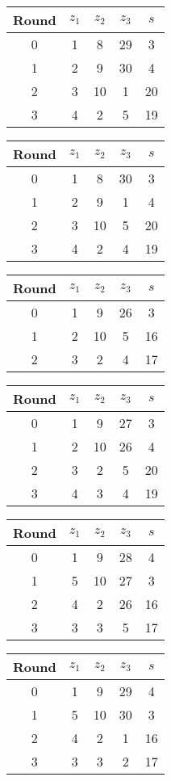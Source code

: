 \begin{multicols}{2}
\begin{tabular}{c | c | c | c | c }
Round & $z_1$ & $z_2$ & $z_3$ & $s$ \\
\hline
0 & 1 & 8 & 29 & 3 \\
1 & 2 & 9 & 30 & 4 \\
2 & 3 & 10 & 1 & 20 \\
3 & 4 & 2 & 5 & 19
\end{tabular}


\begin{tabular}{c | c | c | c | c }
Round & $z_1$ & $z_2$ & $z_3$ & $s$ \\
\hline
0 & 1 & 8 & 30 & 3 \\
1 & 2 & 9 & 1 & 4 \\
2 & 3 & 10 & 5 & 20 \\
3 & 4 & 2 & 4 & 19
\end{tabular}

\begin{tabular}{c | c | c | c | c }
Round & $z_1$ & $z_2$ & $z_3$ & $s$ \\
\hline
0 & 1 & 9 & 26 & 3 \\
1 & 2 & 10 & 5 & 16 \\
2 & 3 & 2 & 4 & 17
\end{tabular}

\begin{tabular}{c | c | c | c | c }
Round & $z_1$ & $z_2$ & $z_3$ & $s$ \\
\hline
0 & 1 & 9 & 27 & 3 \\
1 & 2 & 10 & 26 & 4 \\
2 & 3 & 2 & 5 & 20 \\
3 & 4 & 3 & 4 & 19
\end{tabular}

\begin{tabular}{c | c | c | c | c }
Round & $z_1$ & $z_2$ & $z_3$ & $s$ \\
\hline
0 & 1 & 9 & 28 & 4 \\
1 & 5 & 10 & 27 & 3 \\
2 & 4 & 2 & 26 & 16 \\
3 & 3 & 3 & 5 & 17
\end{tabular}

\begin{tabular}{c | c | c | c | c }
Round & $z_1$ & $z_2$ & $z_3$ & $s$ \\
\hline
0 & 1 & 9 & 29 & 4 \\
1 & 5 & 10 & 30 & 3 \\
2 & 4 & 2 & 1 & 16 \\
3 & 3 & 3 & 2 & 17
\end{tabular}


\end{multicols}
